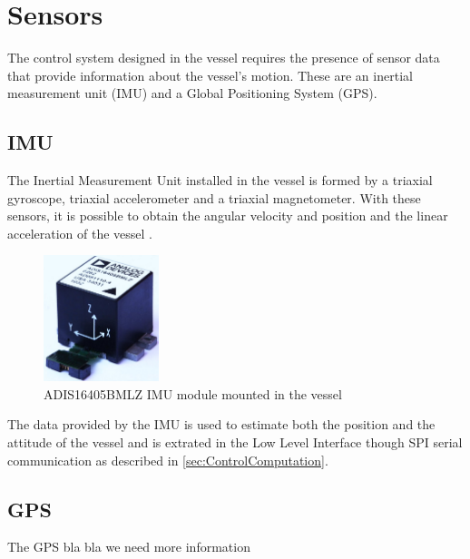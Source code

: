 \section{Sensors}

The control system designed in the vessel requires the presence of sensor data that provide information about the vessel's motion. These are an inertial measurement unit (IMU) and a Global Positioning System (GPS).

\subsection{IMU}

The Inertial Measurement Unit installed in the vessel is formed by a triaxial gyroscope, triaxial accelerometer and a triaxial magnetometer. With these sensors, it is possible to obtain the angular velocity and position and the linear acceleration of the vessel \cite{IMUDatasheet}. 
%
\begin{figure}[H]
	\includegraphics[width=0.3\textwidth]{figures/IMU}
	\caption{ADIS16405BMLZ IMU module mounted in the vessel \cite{IMUFigure}}
	\label{fig:IMU}
\end{figure}
%
The data provided by the IMU is used to estimate both the position and the attitude of the vessel and is extrated in the Low Level Interface though SPI serial communication as described in \autoref{sec:ControlComputation}.



\subsection{GPS}

The GPS bla bla we need more information


